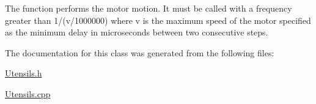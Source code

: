 The function performs the motor motion. It must be called with a frequency greater than 1/(v/1000000) where v is the maximum speed of the motor specified as the minimum delay in microseconds between two consecutive steps. 



The documentation for this class was generated from the following files\+:\begin{DoxyCompactItemize}
\item 
\hyperlink{_utensils_8h}{Utensils.\+h}\item 
\hyperlink{_utensils_8cpp}{Utensils.\+cpp}\end{DoxyCompactItemize}
